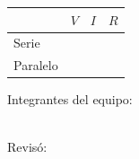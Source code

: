 	\begin{center}
		\begin{tabular}{|p{1.5cm}|p{1.5cm}|p{1.5cm}|p{1.5cm}|}
			\hline
			         & $V$ & $I$ & $R$ \\
			\hline
			Serie    &     &     &     \\
			\hline
			Paralelo &     &     &     \\
			\hline
		\end{tabular}
	\end{center}

	Integrantes del equipo: \\[0.2cm]
	\horrule{0.5pt} \\[0.2cm] %
	\horrule{0.5pt} %

	Revisó: \\[0.2cm]
	\horrule{0.5pt} \\%



